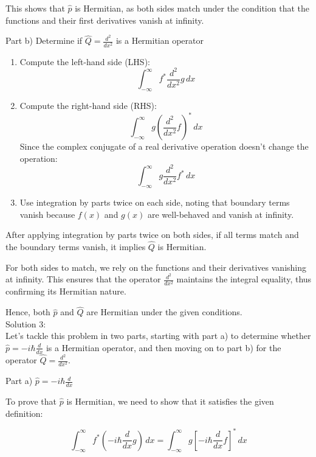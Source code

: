 \documentclass[a4paper,11pt]{article}
\begin{document}
This shows that \( \hat{p} \) is Hermitian, as both sides match under the condition that the functions and their first derivatives vanish at infinity.

Part b) Determine if \( \hat{Q} = \frac{d^{2}}{dx^{2}} \) is a Hermitian operator

\begin{enumerate}
    \item Compute the left-hand side (LHS):
    \[ \int_{-\infty}^{\infty} f^{*}\frac{d^{2}}{dx^{2}}g \, dx \]
    
    \item Compute the right-hand side (RHS):
    \[ \int_{-\infty}^{\infty} g(\frac{d^{2}}{dx^{2}}f)^{*} \, dx \]
    Since the complex conjugate of a real derivative operation doesn't change the operation:
    \[ \int_{-\infty}^{\infty} g\frac{d^{2}}{dx^{2}}f^{*} \, dx \]
    
    \item Use integration by parts twice on each side, noting that boundary terms vanish because \( f(x) \) and \( g(x) \) are well-behaved and vanish at infinity.
\end{enumerate}

After applying integration by parts twice on both sides, if all terms match and the boundary terms vanish, it implies \( \hat{Q} \) is Hermitian.

For both sides to match, we rely on the functions and their derivatives vanishing at infinity. This ensures that the operator \( \frac{d^{2}}{dx^{2}} \) maintains the integral equality, thus confirming its Hermitian nature.

Hence, both \( \hat{p} \) and \( \hat{Q} \) are Hermitian under the given conditions. \\

\noindent Solution 3: \\

Let's tackle this problem in two parts, starting with part a) to determine whether \( \hat{p} = -i\hbar\frac{d}{dx} \) is a Hermitian operator, and then moving on to part b) for the operator \( \hat{Q} = \frac{d^{2}}{dx^{2}} \).

Part a) \( \hat{p} = -i\hbar\frac{d}{dx} \)

To prove that \( \hat{p} \) is Hermitian, we need to show that it satisfies the given definition:

\[ \int_{-\infty}^{\infty} f^{*}(-i\hbar\frac{d}{dx}g) \, dx = \int_{-\infty}^{\infty} g[-i\hbar\frac{d}{dx}f]^{*} \, dx \]
\end{document}
